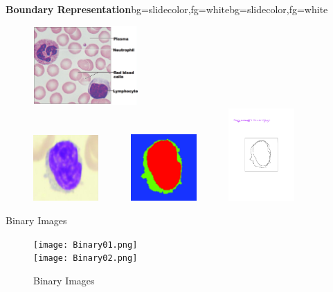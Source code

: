 \subsection{}
\begin{frame}{}
\begin{variableblock}{\centering \Large \textbf{\vspace{4pt}\newline Boundary Representation\vspace{4pt}}}{bg=slidecolor,fg=white}{bg=slidecolor,fg=white}
\end{variableblock}
\begin{figure}
\centering
\includegraphics[width=4cm]{Figures/Paper0.png}\\\vspace{4pt}
\includegraphics[width=2.5cm]{Figures/Paper1.jpg}~~~~~~
\includegraphics[width=2.5cm]{Figures/Paper2.jpg}~~~~~~
\includegraphics[width=2.5cm]{Figures/Paper3}
\end{figure}
\end{frame}

\begin{frame}{Binary Images}
\begin{figure}
\texttt{[image: Binary01.png]}\\
\texttt{[image: Binary02.png]}
\caption{Binary Images}
\end{figure}
\end{frame}

